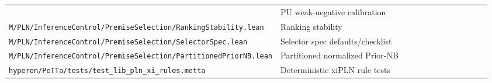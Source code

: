 \documentclass[11pt]{article}
\newcommand{\lpath}[1]{\texttt{\nolinkurl{#1}}}
\begin{document}
\begin{scriptsize}
\begin{longtable}{@{}L{0.48\linewidth}L{0.48\linewidth}@{}}
  & PU weak-negative calibration \\
\lpath{M/PLN/InferenceControl/PremiseSelection/RankingStability.lean}
  & Ranking stability \\
\lpath{M/PLN/InferenceControl/PremiseSelection/SelectorSpec.lean}
  & Selector spec defaults/checklist \\
\lpath{M/PLN/InferenceControl/PremiseSelection/PartitionedPriorNB.lean}
  & Partitioned normalized Prior-NB \\
\lpath{hyperon/PeTTa/tests/test_lib_pln_xi_rules.metta}
  & Deterministic xiPLN rule tests \\
\bottomrule
\end{longtable}
\end{scriptsize}
\end{document}
